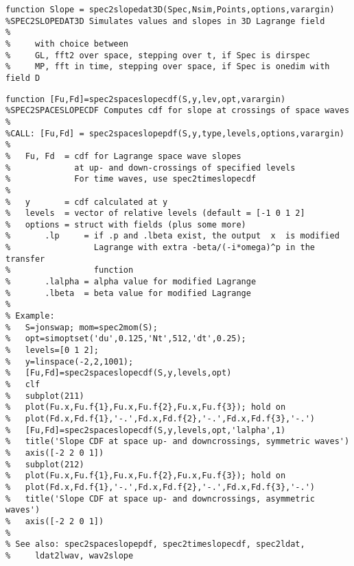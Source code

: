 {\begin{verbatim}
function Slope = spec2slopedat3D(Spec,Nsim,Points,options,varargin)
%SPEC2SLOPEDAT3D Simulates values and slopes in 3D Lagrange field 
%
%     with choice between 
%     GL, fft2 over space, stepping over t, if Spec is dirspec
%     MP, fft in time, stepping over space, if Spec is onedim with field D
\end{verbatim}
\clearpage

\begin{verbatim}
function [Fu,Fd]=spec2spaceslopecdf(S,y,lev,opt,varargin)
%SPEC2SPACESLOPECDF Computes cdf for slope at crossings of space waves 
%
%CALL: [Fu,Fd] = spec2spaceslopepdf(S,y,type,levels,options,varargin)
%
%   Fu, Fd  = cdf for Lagrange space wave slopes 
%             at up- and down-crossings of specified levels
%             For time waves, use spec2timeslopecdf
%
%   y       = cdf calculated at y
%   levels  = vector of relative levels (default = [-1 0 1 2]
%   options = struct with fields (plus some more)
%       .lp     = if .p and .lbeta exist, the output  x  is modified 
%                 Lagrange with extra -beta/(-i*omega)^p in the transfer
%                 function
%       .lalpha = alpha value for modified Lagrange
%       .lbeta  = beta value for modified Lagrange
%
% Example:
%   S=jonswap; mom=spec2mom(S);
%   opt=simoptset('du',0.125,'Nt',512,'dt',0.25);
%   levels=[0 1 2];
%   y=linspace(-2,2,1001);
%   [Fu,Fd]=spec2spaceslopecdf(S,y,levels,opt)
%   clf
%   subplot(211)
%   plot(Fu.x,Fu.f{1},Fu.x,Fu.f{2},Fu.x,Fu.f{3}); hold on
%   plot(Fd.x,Fd.f{1},'-.',Fd.x,Fd.f{2},'-.',Fd.x,Fd.f{3},'-.')
%   [Fu,Fd]=spec2spaceslopecdf(S,y,levels,opt,'lalpha',1)
%   title('Slope CDF at space up- and downcrossings, symmetric waves')
%   axis([-2 2 0 1])
%   subplot(212)
%   plot(Fu.x,Fu.f{1},Fu.x,Fu.f{2},Fu.x,Fu.f{3}); hold on
%   plot(Fd.x,Fd.f{1},'-.',Fd.x,Fd.f{2},'-.',Fd.x,Fd.f{3},'-.')
%   title('Slope CDF at space up- and downcrossings, asymmetric waves')
%   axis([-2 2 0 1])
%
% See also: spec2spaceslopepdf, spec2timeslopecdf, spec2ldat, 
%     ldat2lwav, wav2slope
\end{verbatim}
\clearpage

}
